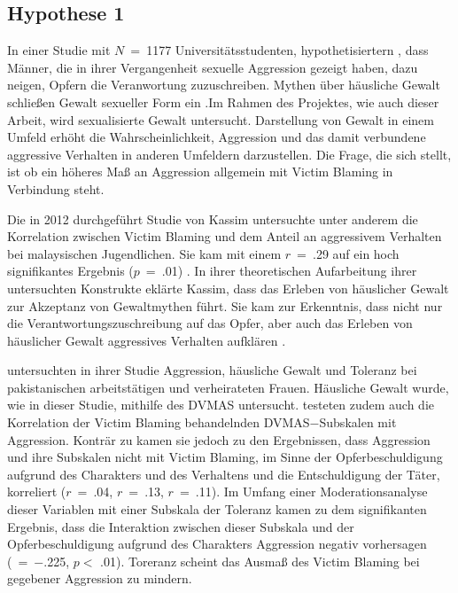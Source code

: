 \subsection{Hypothese 1}  \label{subsec_2.2.1}
In einer Studie mit $N$~=~1177 Universitätsstudenten, hypothetisiertern \textcite{H1_1993}, dass Männer, die in ihrer Vergangenheit sexuelle Aggression gezeigt haben, dazu neigen, Opfern die Veranwortung zuzuschreiben. Mythen über häusliche Gewalt schließen Gewalt sexueller Form ein \parencite{H1_Poli_2022}.Im Rahmen des Projektes, wie auch dieser Arbeit, wird sexualisierte Gewalt untersucht. Darstellung von Gewalt in einem Umfeld erhöht die Wahrscheinlichkeit, Aggression und das damit verbundene aggressive Verhalten in anderen Umfeldern darzustellen. Die Frage, die sich stellt, ist ob ein höheres Maß an Aggression allgemein mit Victim Blaming in Verbindung steht.

Die in 2012 durchgeführt Studie von Kassim untersuchte unter anderem die Korrelation zwischen Victim Blaming und dem Anteil an aggressivem Verhalten bei malaysischen Jugendlichen. Sie kam mit einem $r$~=~.29 auf ein hoch signifikantes Ergebnis ($p$~=~.01) \parencite{H1_malasia_2012}. In ihrer theoretischen Aufarbeitung ihrer untersuchten Konstrukte eklärte Kassim, dass das Erleben von häuslicher Gewalt zur Akzeptanz von Gewaltmythen führt. Sie kam zur Erkenntnis, dass nicht nur die Verantwortungszuschreibung auf das Opfer, aber auch das Erleben von häuslicher Gewalt aggressives Verhalten aufklären \parencite{H1_malasia_2012}.

\textcite{H1_moderation_2020} untersuchten in ihrer Studie Aggression, häusliche Gewalt und Toleranz bei pakistanischen arbeitstätigen und verheirateten Frauen. Häusliche Gewalt wurde, wie in dieser Studie, mithilfe des DVMAS untersucht. \textcite{H1_moderation_2020} testeten zudem auch die Korrelation der Victim Blaming behandelnden DVMAS$-$Subskalen mit Aggression. Konträr zu \textcite{H1_malasia_2012} kamen sie jedoch zu den Ergebnissen, dass Aggression und ihre Subskalen nicht mit Victim Blaming, im Sinne der Opferbeschuldigung aufgrund des Charakters und des Verhaltens und die Entschuldigung der Täter, korreliert ($r$~=~.04, $r$~=~.13, $r$~=~.11). Im Umfang einer Moderationsanalyse dieser Variablen mit einer Subskala der Toleranz kamen \textcite{H1_moderation_2020} zu dem signifikanten Ergebnis, dass die Interaktion zwischen dieser Subskala und der Opferbeschuldigung aufgrund des Charakters Aggression negativ vorhersagen (\textbeta~=~$-$.225, $p<$ .01). Toreranz scheint das Ausmaß des Victim Blaming bei gegebener Aggression zu mindern.

